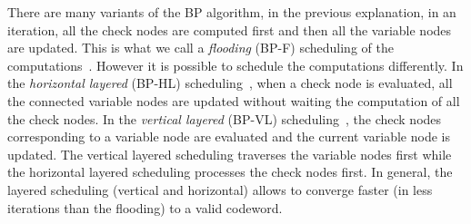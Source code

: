 There are many variants of the BP algorithm, in the previous explanation, in an
iteration, all the check nodes are computed first and then all the variable
nodes are updated. This is what we call a \emph{flooding} (BP-F) scheduling of
the computations~\cite{MacKay1995}. However it is possible to schedule the
computations differently. In the \emph{horizontal layered} (BP-HL)
scheduling~\cite{Yeo2001}, when a check node is evaluated, all the connected
variable nodes are updated without waiting the computation of all the check
nodes. In the \emph{vertical layered} (BP-VL) scheduling~\cite{Zhang2002}, the
check nodes corresponding to a variable node are evaluated and the current
variable node is updated. The vertical layered scheduling traverses the variable
nodes first while the horizontal layered scheduling processes the check nodes
first. In general, the layered scheduling (vertical and horizontal) allows to
converge faster (in less iterations than the flooding) to a valid codeword.



